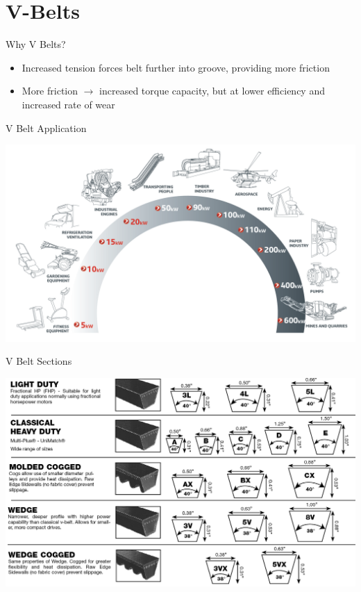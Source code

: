 \documentclass[10pt, svgnames]{beamer}
\begin{document}
\section{V-Belts}
\label{sec:orgb0d2d03}

\begin{frame}[label={sec:org80dccf5}]{Why V Belts?}
\begin{itemize}
\item Increased tension forces belt further into groove, providing more friction
\item More friction \(\rightarrow\) increased torque capacity, but at lower efficiency and increased rate of wear
\end{itemize}
\end{frame}

\begin{frame}[label={sec:org32fc6f1}]{V Belt Application}
\begin{center}
\includegraphics[width=\textwidth]{./pictures/v-belt-applications.png}
\end{center}
\end{frame}

\begin{frame}[label={sec:org060cc28}]{V Belt Sections}
\begin{center}
\includegraphics[width=.9\linewidth]{./pictures/v-belt-sections.png}
\end{center}
\end{frame}
\end{document}
